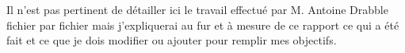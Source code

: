 Il n'est pas pertinent de détailler ici le travail effectué par M. Antoine Drabble fichier par fichier mais j'expliquerai au fur et à mesure de ce rapport ce qui a été fait et ce que je dois modifier ou ajouter pour remplir mes objectifs.





